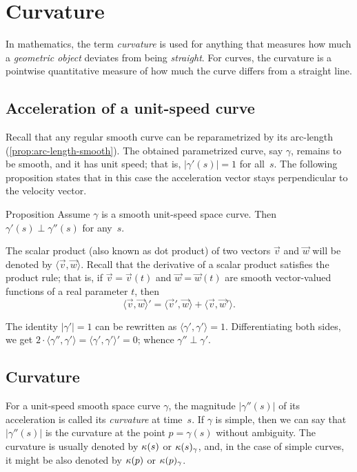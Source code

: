 \chapter{Curvature}
\label{chap:curve-curvature}

In mathematics, the term {}\emph{curvature} is used for anything that measures how much a {}\emph{geometric object} deviates from being {}\emph{straight}.
For curves, the curvature is a pointwise quantitative measure of how much the curve differs from a straight line.




\section{Acceleration of a unit-speed curve}

Recall that any regular smooth curve can be reparametrized by its arc-length (\ref{prop:arc-length-smooth}).
The obtained parametrized curve, say $\gamma$, remains to be smooth, and it has unit speed; 
that is, $|\gamma'(s)|=1$ for all~$s$.
The following proposition states that in this case
the acceleration vector stays perpendicular to the velocity vector.

\begin{thm}{Proposition}\label{prop:a'-pertp-a''}
Assume $\gamma$ is a smooth unit-speed space curve.
Then $\gamma'(s)\perp \gamma''(s)$ for any~$s$.
\end{thm}

The scalar product (also known as dot product) of two vectors $\vec v$ and $\vec w$ will be denoted by $\langle \vec v,\vec w\rangle$.
Recall that the derivative of a scalar product satisfies the product rule;
that is, if $\vec v=\vec v(t)$ and $\vec w=\vec w(t)$ are smooth vector-valued functions of a real parameter $t$, then
\[\langle \vec v,\vec w\rangle'=\langle \vec v',\vec w\rangle+\langle \vec v,\vec w'\rangle.\]

The identity $|\gamma'|=1$ can be rewritten as $\langle\gamma',\gamma'\rangle=1$.
Differentiating both sides, we get
$2\cdot\langle\gamma'',\gamma'\rangle=\langle\gamma',\gamma'\rangle'=0$;
whence $\gamma''\perp\gamma'$.
\qeds

\section{Curvature}\label{sec:curvature}

For a unit-speed smooth space curve $\gamma$, the magnitude $|\gamma''(s)|$ of its acceleration is called its \emph{curvature} at  time~$s$.
If $\gamma$ is simple, then we can say that $|\gamma''(s)|$ is the curvature at the point $p=\gamma(s)$ without ambiguity.
The curvature is usually denoted by $\kappa(s)$ or $\kappa(s)_\gamma$, and, in the case of simple curves, it might be also denoted by $\kappa(p)$ or $\kappa(p)_\gamma$.



